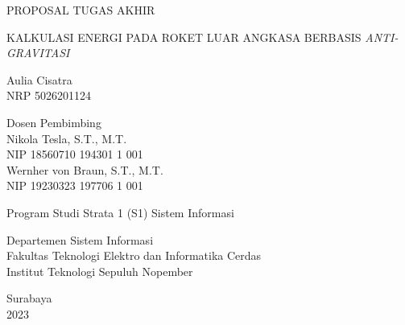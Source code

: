 \begin{large}
  PROPOSAL TUGAS AKHIR 
\end{large}

\vspace{\fill}

\begin{spacing}{1.5}
  \begin{Large}
    KALKULASI ENERGI PADA ROKET LUAR 
    ANGKASA BERBASIS \emph{ANTI-GRAVITASI}
  \end{Large}
\end{spacing}

\vspace{\fill}

\begin{large}
  Aulia Cisatra \\
  \textmd{NRP 5026201124}
\end{large}

\vspace{\fill}

\begin{large}
  \textmd{Dosen Pembimbing} \\
  Nikola Tesla, S.T., M.T. \\
  \textmd{NIP 18560710 194301 1 001} \\
  Wernher von Braun, S.T., M.T. \\
  \textmd{NIP 19230323 197706 1 001}
\end{large}

\vspace{\fill}

Program Studi Strata 1 (S1) Sistem Informasi \\

\mdseries

Departemen Sistem Informasi \\
Fakultas Teknologi Elektro dan Informatika Cerdas \\
Institut Teknologi Sepuluh Nopember

Surabaya \\
2023
